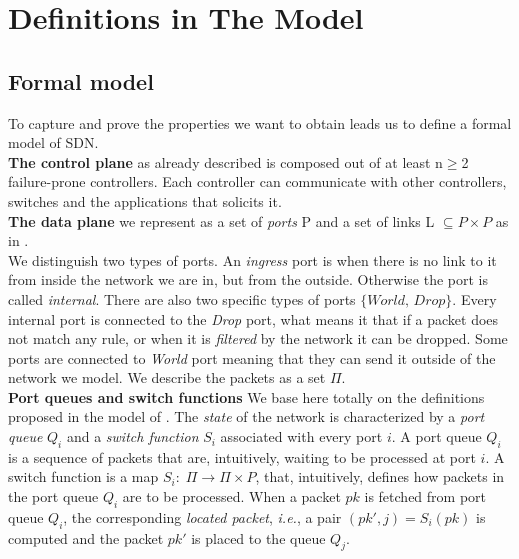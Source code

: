 \documentclass{article}
\theoremstyle{remark}
\begin{document}
\section{Definitions in The Model}
\subsection{Formal model}
To capture and prove the properties we want to obtain leads us to define a formal model of SDN. \\
% 
\textbf{The control plane} as already described is composed out of at least n$\geq$2 failure-prone controllers. Each controller can communicate with other controllers, switches and the applications that solicits it. \\
\textbf{The data plane} we represent as a set of \emph{ports} P and a set of links L $\subseteq P\times P$ as in \cite{Reitblatt:2012:ANU:2342356.2342427}. \\
We distinguish two types of ports. An \emph{ingress} port is when there is no link to it from inside the network we are in, but from the outside. Otherwise the port is called \emph{internal}. There are also two specific types of ports $\lbrace \textit{World, Drop}\rbrace$. Every internal port is connected to the \emph{Drop} port, what means it that if a packet does not match any rule, or when it is \emph{filtered} by the network it can be dropped. Some ports are connected to \emph{World} port meaning that they can send it outside of the network we model. We describe the packets as a set $\Pi$.\\
\textbf{Port queues and switch functions} We base here totally on the definitions proposed in the model of \cite{CKLS15}.
The \emph{state} of the network is characterized by a \emph{port
  queue} $Q_i$ and a \emph{switch function} $S_i$ associated with
every port $i$.
A port queue $Q_i$ is a sequence of packets that are, intuitively, waiting to be processed at port $i$.
A switch function is a map $S_i:\;\Pi\rightarrow \Pi\times P$,
that, intuitively, defines how packets in
the port queue $Q_i$ are to be processed.
When a packet $\textit{pk}$ is fetched from port queue $Q_i$, the corresponding \emph{located
  packet}, \emph{i.e.}, a pair $(\textit{pk}',j)=S_i(\textit{pk})$ is computed and the packet $\textit{pk}'$ is placed to the queue $Q_j$.
\end{document}
